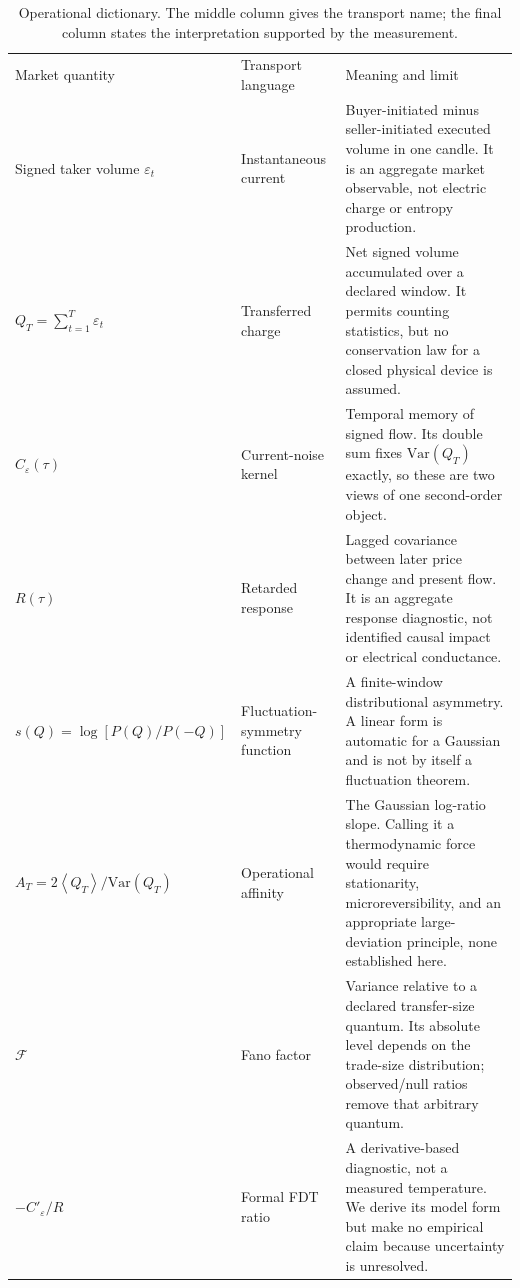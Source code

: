 \documentclass[aps,pre,twocolumn,superscriptaddress,floatfix,nofootinbib]{revtex4-2}
\newcommand{\eps}{\varepsilon}
\newcommand{\avg}[1]{\left\langle #1 \right\rangle}
\newcommand{\Var}{\mathrm{Var}}
\begin{document}
\begin{table}[t]
\caption{Operational dictionary. The middle column gives the transport name;
the final column states the interpretation supported by the measurement.}
\label{tab:dictionary}
\begin{ruledtabular}
\begin{tabular}{p{}p{}p{}}
Market quantity & Transport language & Meaning and limit \\
\colrule
Signed taker volume $\eps_t$ & Instantaneous current & Buyer-initiated minus seller-initiated executed volume in one candle. It is an aggregate market observable, not electric charge or entropy production. \\
$Q_T=\sum_{t=1}^{T}\eps_t$ & Transferred charge & Net signed volume accumulated over a declared window. It permits counting statistics, but no conservation law for a closed physical device is assumed. \\
$C_\eps(\tau)$ & Current-noise kernel & Temporal memory of signed flow. Its double sum fixes $\Var(Q_T)$ exactly, so these are two views of one second-order object. \\
$R(\tau)$ & Retarded response & Lagged covariance between later price change and present flow. It is an aggregate response diagnostic, not identified causal impact or electrical conductance. \\
$s(Q)=\log[P(Q)/P(-Q)]$ & Fluctuation-symmetry function & A finite-window distributional asymmetry. A linear form is automatic for a Gaussian and is not by itself a fluctuation theorem. \\
$A_T=2\avg{Q_T}/\Var(Q_T)$ & Operational affinity & The Gaussian log-ratio slope. Calling it a thermodynamic force would require stationarity, microreversibility, and an appropriate large-deviation principle, none established here. \\
$\mathcal F$ & Fano factor & Variance relative to a declared transfer-size quantum. Its absolute level depends on the trade-size distribution; observed/null ratios remove that arbitrary quantum. \\
$-C'_\eps/R$ & Formal FDT ratio & A derivative-based diagnostic, not a measured temperature. We derive its model form but make no empirical claim because uncertainty is unresolved. \\
\end{tabular}
\end{ruledtabular}
\end{table}
\end{document}

